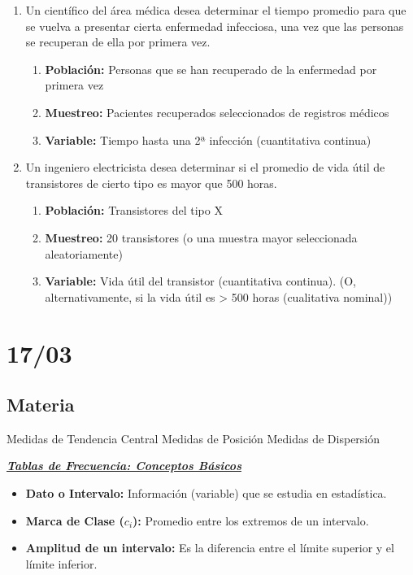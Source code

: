 \documentclass[12pt, letterpaper]{article}
\begin{document}
\begin{enumerate}
    \item Un científico del área médica desea determinar el tiempo promedio para que se vuelva a presentar cierta enfermedad infecciosa, una vez que las personas se recuperan de ella por primera vez.
        \begin{enumerate}
            \item \textbf{Población:} Personas que se han recuperado de la enfermedad por primera vez
            \item \textbf{Muestreo:} Pacientes recuperados seleccionados de registros médicos
            \item \textbf{Variable:} Tiempo hasta una 2ª infección (cuantitativa continua) %
        \end{enumerate}

    \item Un ingeniero electricista desea determinar si el promedio de vida útil de transistores de cierto tipo es mayor que 500 horas.
        \begin{enumerate}
            \item \textbf{Población:} Transistores del tipo X
            \item \textbf{Muestreo:} 20 transistores (o una muestra mayor seleccionada aleatoriamente)
            \item \textbf{Variable:} Vida útil del transistor (cuantitativa continua). (O, alternativamente, si la vida útil es > 500 horas (cualitativa nominal))  %
        \end{enumerate}
\end{enumerate}
\newpage

\section{17/03}
\subsection{Materia}
Medidas de Tendencia Central 
Medidas de Posición 
Medidas de Dispersión 

\textbf{\textit{\underline{Tablas de Frecuencia: Conceptos Básicos}}}
\begin{itemize}
    \item \textbf{Dato o Intervalo:} Información (variable) que se estudia en estadística.
    \item \textbf{Marca de Clase ($c_i$):} Promedio entre los extremos de un intervalo. %
    \item \textbf{Amplitud de un intervalo:} Es la diferencia entre el límite superior y el límite inferior.
\end{itemize}
\end{document}
